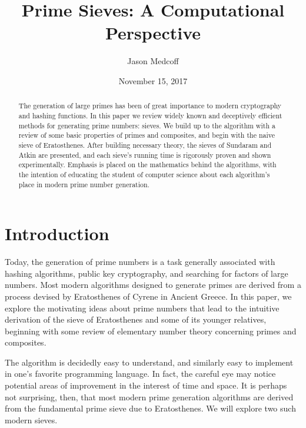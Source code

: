 \documentclass{amsart}
\title{Prime Sieves: A Computational Perspective}
\author{Jason Medcoff}
\date{November 15, 2017}
\theoremstyle{definition}
\theoremstyle{case}
\begin{document}
    \maketitle
    
    \begin{abstract}
    	The generation of large primes has been of great importance to modern cryptography and hashing functions. In this paper we review widely known and deceptively efficient methods for generating prime numbers: sieves. We build up to the algorithm with a review of some basic properties of primes and composites, and begin with the naive sieve of Eratosthenes. After building necessary theory, the sieves of Sundaram and Atkin are presented, and each sieve's running time is rigorously proven and shown experimentally.
    	Emphasis is placed on the mathematics behind the algorithms, with the intention of educating the student of computer science about each algorithm's place in modern prime number generation.
    \end{abstract}
    
    
    
    \section*{Introduction}
    
    Today, the generation of prime numbers is a task generally associated with hashing algorithms, public key cryptography, and searching for factors of large numbers. Most modern algorithms designed to generate primes are derived from a process devised by Eratosthenes of Cyrene in Ancient Greece. In this paper, we explore the motivating ideas about prime numbers that lead to the intuitive derivation of the sieve of Eratosthenes and some of its younger relatives, beginning with some review of elementary number theory concerning primes and composites.
        
    The algorithm is decidedly easy to understand, and similarly easy to implement in one's favorite programming language. In fact, the careful eye may notice potential areas of improvement in the interest of time and space. It is perhaps not surprising, then, that most modern prime generation algorithms are derived from the fundamental prime sieve due to Eratosthenes. We will explore two such modern sieves.
    
\end{document}
